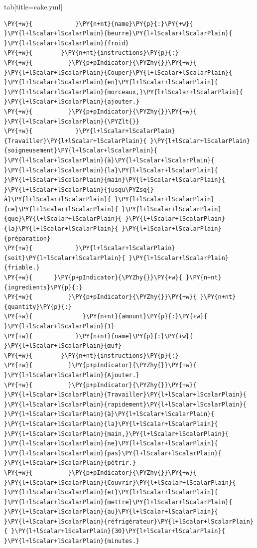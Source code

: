 \documentclass[a4paper,twoside]{article}
\begin{document}
\begin{tsdiv}{tab}[title=cake.yml]
\begin{tscode}[lang=yaml, engine=pygments]
\begin{Verbatim}[commandchars=\\\{\},breaklines, breakanywhere, commandchars=\\\{\}]
\PY{+w}{            }\PY{n+nt}{name}\PY{p}{:}\PY{+w}{ }\PY{l+lScalar+lScalarPlain}{beurre}\PY{l+lScalar+lScalarPlain}{ }\PY{l+lScalar+lScalarPlain}{froid}
\PY{+w}{        }\PY{n+nt}{instructions}\PY{p}{:}
\PY{+w}{          }\PY{p+pIndicator}{\PYZhy{}}\PY{+w}{ }\PY{l+lScalar+lScalarPlain}{Couper}\PY{l+lScalar+lScalarPlain}{ }\PY{l+lScalar+lScalarPlain}{en}\PY{l+lScalar+lScalarPlain}{ }\PY{l+lScalar+lScalarPlain}{morceaux,}\PY{l+lScalar+lScalarPlain}{ }\PY{l+lScalar+lScalarPlain}{ajouter.}
\PY{+w}{          }\PY{p+pIndicator}{\PYZhy{}}\PY{+w}{ }\PY{l+lScalar+lScalarPlain}{\PYZlt{}}
\PY{+w}{            }\PY{l+lScalar+lScalarPlain}{Travailler}\PY{l+lScalar+lScalarPlain}{ }\PY{l+lScalar+lScalarPlain}{soigneusement}\PY{l+lScalar+lScalarPlain}{ }\PY{l+lScalar+lScalarPlain}{à}\PY{l+lScalar+lScalarPlain}{ }\PY{l+lScalar+lScalarPlain}{la}\PY{l+lScalar+lScalarPlain}{ }\PY{l+lScalar+lScalarPlain}{main}\PY{l+lScalar+lScalarPlain}{ }\PY{l+lScalar+lScalarPlain}{jusqu\PYZsq{}à}\PY{l+lScalar+lScalarPlain}{ }\PY{l+lScalar+lScalarPlain}{ce}\PY{l+lScalar+lScalarPlain}{ }\PY{l+lScalar+lScalarPlain}{que}\PY{l+lScalar+lScalarPlain}{ }\PY{l+lScalar+lScalarPlain}{la}\PY{l+lScalar+lScalarPlain}{ }\PY{l+lScalar+lScalarPlain}{préparation}
\PY{+w}{            }\PY{l+lScalar+lScalarPlain}{soit}\PY{l+lScalar+lScalarPlain}{ }\PY{l+lScalar+lScalarPlain}{friable.}
\PY{+w}{      }\PY{p+pIndicator}{\PYZhy{}}\PY{+w}{ }\PY{n+nt}{ingredients}\PY{p}{:}
\PY{+w}{          }\PY{p+pIndicator}{\PYZhy{}}\PY{+w}{ }\PY{n+nt}{quantity}\PY{p}{:}
\PY{+w}{              }\PY{n+nt}{amount}\PY{p}{:}\PY{+w}{ }\PY{l+lScalar+lScalarPlain}{1}
\PY{+w}{            }\PY{n+nt}{name}\PY{p}{:}\PY{+w}{ }\PY{l+lScalar+lScalarPlain}{œuf}
\PY{+w}{        }\PY{n+nt}{instructions}\PY{p}{:}
\PY{+w}{          }\PY{p+pIndicator}{\PYZhy{}}\PY{+w}{ }\PY{l+lScalar+lScalarPlain}{Ajouter.}
\PY{+w}{          }\PY{p+pIndicator}{\PYZhy{}}\PY{+w}{ }\PY{l+lScalar+lScalarPlain}{Travailler}\PY{l+lScalar+lScalarPlain}{ }\PY{l+lScalar+lScalarPlain}{rapidement}\PY{l+lScalar+lScalarPlain}{ }\PY{l+lScalar+lScalarPlain}{à}\PY{l+lScalar+lScalarPlain}{ }\PY{l+lScalar+lScalarPlain}{la}\PY{l+lScalar+lScalarPlain}{ }\PY{l+lScalar+lScalarPlain}{main,}\PY{l+lScalar+lScalarPlain}{ }\PY{l+lScalar+lScalarPlain}{ne}\PY{l+lScalar+lScalarPlain}{ }\PY{l+lScalar+lScalarPlain}{pas}\PY{l+lScalar+lScalarPlain}{ }\PY{l+lScalar+lScalarPlain}{pétrir.}
\PY{+w}{          }\PY{p+pIndicator}{\PYZhy{}}\PY{+w}{ }\PY{l+lScalar+lScalarPlain}{Couvrir}\PY{l+lScalar+lScalarPlain}{ }\PY{l+lScalar+lScalarPlain}{et}\PY{l+lScalar+lScalarPlain}{ }\PY{l+lScalar+lScalarPlain}{mettre}\PY{l+lScalar+lScalarPlain}{ }\PY{l+lScalar+lScalarPlain}{au}\PY{l+lScalar+lScalarPlain}{ }\PY{l+lScalar+lScalarPlain}{réfrigérateur}\PY{l+lScalar+lScalarPlain}{ }\PY{l+lScalar+lScalarPlain}{30}\PY{l+lScalar+lScalarPlain}{ }\PY{l+lScalar+lScalarPlain}{minutes.}

\end{Verbatim}
\end{tscode}
\end{tsdiv}
\end{document}
